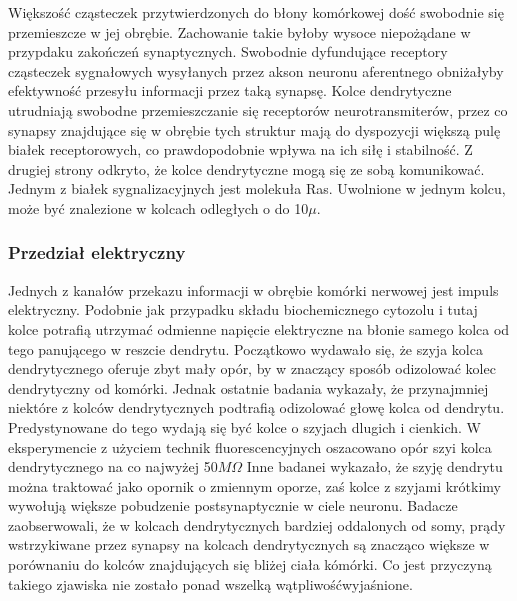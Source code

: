 \documentclass{article}
\begin{document}
Większość cząsteczek przytwierdzonych do błony komórkowej dość swobodnie się przemieszcze w jej obrębie. 
Zachowanie takie byłoby wysoce niepożądane w przypdaku zakończeń synaptycznych. 
Swobodnie dyfundujące receptory cząsteczek sygnałowych wysyłanych przez akson neuronu aferentnego obniżałyby efektywność przesyłu informacji przez taką synapsę. 
Kolce dendrytyczne utrudniają swobodne przemieszczanie się receptorów neurotransmiterów, przez co synapsy znajdujące się w obrębie tych struktur mają do dyspozycji większą pulę białek receptorowych, co prawdopodobnie wpływa na ich siłę i stabilność.
Z drugiej strony odkryto, że kolce dendrytyczne mogą się ze sobą komunikować.
Jednym z białek sygnalizacyjnych jest molekuła Ras.
Uwolnione w jednym kolcu, może być znalezione w kolcach odległych o do 10\(\mu\).

\subsubsection{Przedział elektryczny}
Jednych z kanałów przekazu informacji w obrębie komórki nerwowej jest impuls elektryczny.
Podobnie jak przypadku składu biochemicznego cytozolu i tutaj kolce potrafią utrzymać odmienne napięcie elektryczne na błonie samego kolca od tego panującego w reszcie dendrytu.
Początkowo wydawało się, że szyja kolca dendrytycznego oferuje zbyt mały opór, by w znaczący sposób odizolować kolec dendrytyczny od komórki. 
Jednak ostatnie badania wykazały, że przynajmniej niektóre z kolców dendrytycznych podtrafią odizolować głowę kolca od dendrytu.
Predystynowane do tego wydają się być kolce o szyjach dlugich i cienkich.
W eksperymencie z użyciem technik fluorescencyjnych oszacowano opór szyi kolca dendrytycznego na co najwyżej 50\(M\Omega\)
Inne badanei wykazało, że szyję dendrytu można traktować jako opornik o zmiennym oporze, zaś kolce z szyjami krótkimy wywołują większe pobudzenie postsynaptycznie w ciele neuronu.
Badacze zaobserwowali, że w kolcach dendrytycznych bardziej oddalonych od somy, prądy wstrzykiwane przez synapsy na kolcach dendrytycznych są znacząco większe w porównaniu do kolców znajdujących się bliżej ciała kómórki.
Co jest przyczyną takiego zjawiska nie zostało ponad wszelką wątpliwośćwyjaśnione\citep{Sala2014}.
\end{document}
